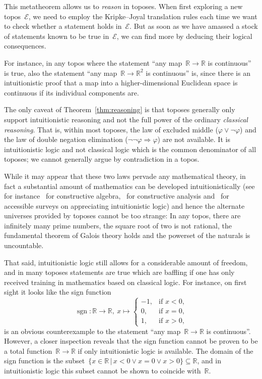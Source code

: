 \documentclass[graybox]{svmult}
\renewcommand{\E}{\mathcal{E}}
\newcommand{\RR}{\mathbb{R}}
\renewcommand{\_}{\mathpunct{.}\,}
\newcommand{\?}{\,{:}\,}
\begin{document}
This metatheorem allows us to \emph{reason} in toposes. When first exploring a
new topos~$\E$, we need to employ the Kripke--Joyal translation rules each time
we want to check whether a statement holds in~$\E$. But as soon as we
have amassed a stock of statements known to be true in~$\E$, we can find more
by deducing their logical consequences.

For instance, in any topos where the statement ``any map~$\RR \to \RR$ is
continuous'' is true, also the statement ``any map~$\RR \to \RR^2$ is
continuous'' is, since there is an intuitionistic proof that a map into a
higher-dimensional Euclidean space is continuous if its individual components
are.

The only caveat of Theorem~\ref{thm:reasoning} is that toposes generally only
support intuitionistic reasoning and not the full power of the ordinary
\emph{classical reasoning}. That is, within most toposes, the law of excluded
middle ($\varphi \vee \neg\varphi$) and the law of double negation elimination
($\neg\neg\varphi \Rightarrow \varphi$) are not available. It is intuitionistic
logic and not classical logic which is the common denominator of all toposes;
we cannot generally argue by contradiction in a topos.

While it may appear that these two laws pervade any mathematical theory, in
fact a substantial amount of mathematics can be developed intuitionistically
(see for
instance~\cite{mines-richman-ruitenburg:constructive-algebra,lombardi-quitte:constructive-algebra}
for constructive algebra,~\cite{bishop-bridges:constructive-analysis} for
constructive analysis
and~\cite{bauer:int-mathematics,bauer:video,melikhov:intuitionistic-logic} for
accessible surveys on appreciating intuitionistic logic) and hence the alternate universes provided by toposes
cannot be too strange: In any topos, there are infinitely many prime numbers,
the square root of two is not rational, the fundamental theorem of Galois
theory holds and the powerset of the naturals is uncountable.

That said, intuitionistic logic still allows for a considerable amount of
freedom, and in many toposes statements are true which are baffling if one has
only received training in mathematics based on classical logic. For instance, on first sight it
looks like the sign function
\[ \operatorname{sgn} : \RR \longrightarrow \RR,\ x \longmapsto \begin{cases}
  -1, & \text{if $x < 0$,} \\
  0, & \text{if $x = 0$,} \\
  1, & \text{if $x > 0$,}
\end{cases} \]
is an obvious counterexample to the statement ``any map~$\RR \to \RR$ is
continuous''. However, a closer inspection reveals that the sign function
cannot be proven to be a total function~$\RR \to \RR$ if only intuitionistic
logic is available. The domain of the sign
function is the subset~$\{ x \in \RR \,|\, x < 0 \vee x = 0 \vee x > 0 \}
\subseteq \RR$, and in intuitionistic logic this subset cannot be shown to
coincide with~$\RR$.
\end{document}
